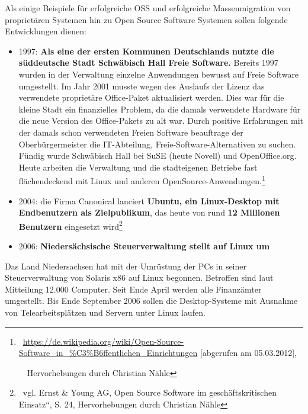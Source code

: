\documentclass[a4paper]{article}
\newcommand\textstyleInternetlink[1]{\foreignlanguage{english}{\textcolor[rgb]{0.0,0.0,0.5019608}{#1}}}
\newcommand\liststyleWWviiiNumiii{%
\renewcommand\theenumi{\arabic{enumi}}
\renewcommand\theenumii{\arabic{enumii}}
\renewcommand\theenumiii{\arabic{enumiii}}
\renewcommand\labelitemi{{}-}
\renewcommand\labelenumi{\theenumi.}
\renewcommand\labelenumii{\theenumii.}
\renewcommand\labelenumiii{\theenumiii.}
}
\begin{document}
{
Als einige Beispiele f\"ur erfolgreiche OSS und erfolgreiche
Massenmigration von propriet\"aren Systemen hin zu Open Source Software
Systemen sollen folgende Entwicklungen dienen:}


\bigskip

\liststyleWWviiiNumiii
\begin{itemize}
\item {
1997: {\guillemotright}\textbf{Als eine der ersten Kommunen Deutschlands
nutzte die s\"uddeutsche Stadt Schw\"abisch Hall Freie Software.}
Bereits 1997 wurden in der Verwaltung einzelne Anwendungen bewusst auf
Freie Software umgestellt. Im Jahr 2001 musste wegen des Auslaufs der
Lizenz das verwendete propriet\"are Office-Paket aktualisiert werden.
Dies war f\"ur die kleine Stadt ein finanzielles Problem, da die damals
verwendete Hardware f\"ur die neue Version des Office-Pakets zu alt
war. Durch positive Erfahrungen mit der damals schon verwendeten Freien
Software beauftrage der Oberb\"urgermeister die IT-Abteilung,
Freie-Software-Alternativen zu suchen. F\"undig wurde Schw\"abisch Hall
bei SuSE (heute Novell) und OpenOffice.org. Heute arbeiten die
Verwaltung und die stadteigenen Betriebe fast fl\"achendeckend mit
Linux und anderen
OpenSource-Anwendungen.{\guillemotleft}\footnote{\ \href{https://de.wikipedia.org/wiki/Open-Source-Software_in_?ffentlichen_Einrichtungen}{\textstyleInternetlink{https://de.wikipedia.org/wiki/Open-Source-Software\_in\_\%C3\%B6ffentlichen\_Einrichtungen}}
[abgerufen am 05.03.2012],\par \ \ Hervorhebungen durch Christian
N\"ahle}}
\end{itemize}

\bigskip

\liststyleWWviiiNumiii
\begin{itemize}
\item {
{\guillemotright}2004: die Firma Canonical lanciert \textbf{Ubuntu, ein
Linux-Desktop mit Endbenutzern als Zielpublikum}, das heute von rund
\textbf{12 Millionen Benutzern} eingesetzt
wird{\guillemotleft}\footnote{\ vgl. Ernst \& Young AG,
{\quotedblbase}Open Source Software im gesch\"aftskritischen
Einsatz{\textquotedblleft}, S. 24, Hervorhebungen durch Christian
N\"ahle}}
\end{itemize}

\bigskip

\liststyleWWviiiNumiii
\begin{itemize}
\item {
2006: {\guillemotright}\textbf{Nieders\"achsische Steuerverwaltung
stellt auf Linux um}}
\end{itemize}
{
Das Land Niedersachsen hat mit der Umr\"ustung der PCs in seiner
Steuerverwaltung von Solaris x86 auf Linux begonnen. Betroffen sind
laut Mitteilung 12.000 Computer. Seit Ende April werden alle
Finanz\"amter umgestellt. Bis Ende September 2006 sollen die
Desktop-Systeme mit Ausnahme von Telearbeitspl\"atzen und Servern unter
Linux laufen.}
\end{document}
